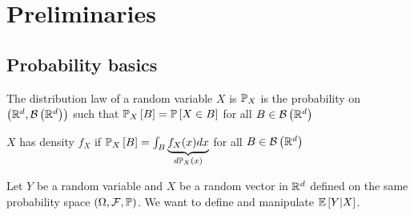 \section{Preliminaries}
\subsection{Probability basics}
\begin{definition}
    The distribution law of a random variable $X$ is $\mathbb{P}_X$ is the probability on $\left(\mathbb{R}^d,\mathcal{B}\left(\mathbb{R}^d\right)\right)$ such that  $\mathbb{P}_X\left[B\right]=\mathbb{P}\left[X\in B\right]$ for all $B\in \mathcal{B}\left(\mathbb{R}^d\right)$
\end{definition}

\begin{definition}[density]
    $X$ has density $f_X$ if $\mathbb{P}_X\left[B\right]=\int_B \underbrace{f_X(x)dx}_{d\mathbb{P}_X(x)}$ for all $B\in \mathcal{B}\left(\mathbb{R}^d\right)$
\end{definition}

Let $Y$ be a random variable and $X$ be a random vector in $\mathbb{R}^d$ defined on the same probability space $(\Omega, \mathcal{F}, \mathbb{P})$. We want to define and manipulate $\mathbb{E}\left[Y|X\right]$.


